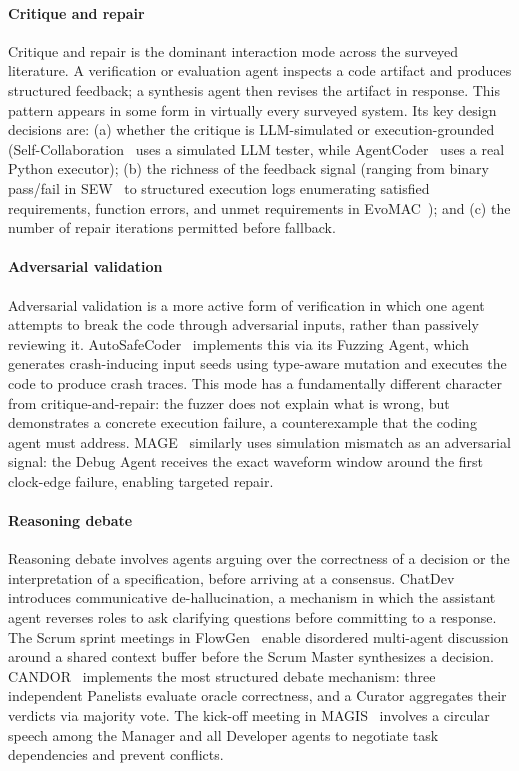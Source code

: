 \paragraph{Critique and repair} Critique and repair is the
dominant interaction mode across the surveyed literature. A
verification or evaluation agent inspects a code artifact and
produces structured feedback; a synthesis agent then revises the
artifact in response. This pattern appears in some form in
virtually every surveyed system. Its key design decisions are:
(a) whether the critique is LLM-simulated or execution-grounded
(Self-Collaboration~\cite{Dong2024SelfCollaboration} uses a
simulated LLM tester, while
AgentCoder~\cite{huang2023agentcoder} uses a real Python
executor); (b) the richness of the feedback signal (ranging from
binary pass/fail in SEW~\cite{Liu2025SEW} to structured execution
logs enumerating satisfied requirements, function errors, and
unmet requirements in EvoMAC~\cite{Hu2025EvoMAC}); and (c) the
number of repair iterations permitted before fallback.

\paragraph{Adversarial validation} Adversarial validation is a
more active form of verification in which one agent attempts to
break the code through adversarial inputs, rather than passively
reviewing it. AutoSafeCoder~\cite{Nunez2024AutoSafeCoder}
implements this via its Fuzzing Agent, which generates
crash-inducing input seeds using type-aware mutation and executes
the code to produce crash traces. This mode has a fundamentally
different character from critique-and-repair: the fuzzer does not
explain what is wrong, but demonstrates a concrete execution
failure, a counterexample that the coding agent must address.
MAGE~\cite{Zhao2024MAGE} similarly uses simulation mismatch as an
adversarial signal: the Debug Agent receives the exact waveform
window around the first clock-edge failure, enabling targeted
repair.

\paragraph{Reasoning debate} Reasoning debate involves agents
arguing over the correctness of a decision or the interpretation
of a specification, before arriving at a consensus.
ChatDev~\cite{Qian2023ChatDev} introduces communicative
de-hallucination, a mechanism in which the assistant agent
reverses roles to ask clarifying questions before committing to a
response. The Scrum sprint meetings in
FlowGen~\cite{Lin2025Soen101} enable disordered multi-agent
discussion around a shared context buffer before the Scrum Master
synthesizes a decision. CANDOR~\cite{Xu2025Hallucination}
implements the most structured debate mechanism: three
independent Panelists evaluate oracle correctness, and a Curator
aggregates their verdicts via majority vote. The kick-off meeting
in MAGIS~\cite{Tao2024Magis} involves a circular speech among the
Manager and all Developer agents to negotiate task dependencies
and prevent conflicts.


